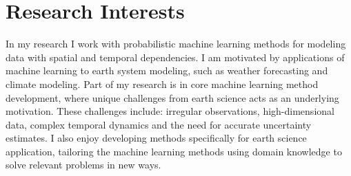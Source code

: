 \section*{Research Interests}
In my research I work with probabilistic machine learning methods for modeling data with spatial and temporal dependencies.
I am motivated by applications of machine learning to earth system modeling, such as weather forecasting and climate modeling.
Part of my research is in core machine learning method development, where unique challenges from earth science acts as an underlying motivation.
These challenges include: irregular observations, high-dimensional data, complex temporal dynamics and the need for accurate uncertainty estimates.
I also enjoy developing methods specifically for earth science application, tailoring the machine learning methods using domain knowledge to solve relevant problems in new ways.
